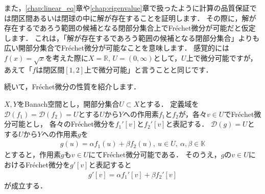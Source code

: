 また，\ref{chap:linear_eq}章や\ref{chap:eigenvalue}章で扱ったように計算の品質保証では閉区間あるいは閉球の中に解が存在することを証明します．
その際に，解が存在するであろう範囲の候補となる閉部分集合上でFr\'echet微分が可能だと仮定します．
これは，「解が存在するであろう範囲の候補となる閉部分集合」よりも広い開部分集合でFr\'echet微分が可能なことを意味します．
感覚的には$f(x) = \sqrt{x}$を考えた際に$X = {\mathbb R}$, $U = (0, \infty)$として，$U$上で微分可能ですが，あえて「$f$は閉区間$[1, 2]$上で微分可能」と言うことと同じです．

続いて，Fr\'echet微分の性質を紹介します．

\begin{Thm}[Fr\'echet微分の線形性]\label{thm:frechet_linear_arith}
$X, Y$をBanach空間とし，開部分集合$U \subset X$とする．
定義域を${\mathcal D}(f_1) = {\mathcal D}(f_2)  = U$とする$U$から$Y$への作用素$f_1$と$f_2$が，各々$v \in U$でFr\'echet微分可能とし，
各々のFr\'echet微分を$f_1'[v]$と$f_2'[v]$と表記する．
${\mathcal D}(g)  = U$とする$U$から$Y$への作用素$g$を
\begin{align*}
g(u) = \alpha f_1(u) + \beta f_2(u), ~ u \in U, ~ \alpha, \beta \in {\mathbb K}
\end{align*}
とすると，作用素$g$も$v \in U$にてFr\'echet微分可能である．
そのうえ，$g$の$v \in U$におけるFr\'echet微分を$g'[v]$と表記すると
\begin{align*}
g'[v] = \alpha f_1'[v] + \beta f_2'[v]
\end{align*}
が成立する．
\end{Thm}

